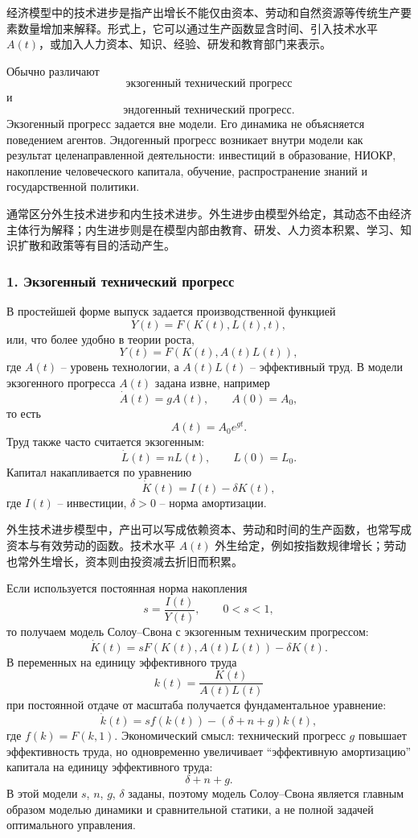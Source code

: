 \documentclass[12pt,a4paper]{article}
\newcommand{\zh}[1]{\par\noindent #1\par}
\begin{document}
\zh{经济模型中的技术进步是指产出增长不能仅由资本、劳动和自然资源等传统生产要素数量增加来解释。形式上，它可以通过生产函数显含时间、引入技术水平 $A(t)$，或加入人力资本、知识、经验、研发和教育部门来表示。}

Обычно различают
\[
\text{экзогенный технический прогресс}
\]
и
\[
\text{эндогенный технический прогресс}.
\]
Экзогенный прогресс задается вне модели. Его динамика не объясняется поведением агентов. Эндогенный прогресс возникает внутри модели как результат целенаправленной деятельности: инвестиций в образование, НИОКР, накопление человеческого капитала, обучение, распространение знаний и государственной политики.

\zh{通常区分外生技术进步和内生技术进步。外生进步由模型外给定，其动态不由经济主体行为解释；内生进步则是在模型内部由教育、研发、人力资本积累、学习、知识扩散和政策等有目的活动产生。}

\subsubsection*{1. Экзогенный технический прогресс}
В простейшей форме выпуск задается производственной функцией
\[
Y(t)=F(K(t),L(t),t),
\]
или, что более удобно в теории роста,
\[
Y(t)=F(K(t),A(t)L(t)),
\]
где $A(t)$ -- уровень технологии, а $A(t)L(t)$ -- эффективный труд. В модели экзогенного прогресса $A(t)$ задана извне, например
\[
\dot A(t)=gA(t), \qquad A(0)=A_0,
\]
то есть
\[
A(t)=A_0e^{gt}.
\]
Труд также часто считается экзогенным:
\[
\dot L(t)=nL(t), \qquad L(0)=L_0.
\]
Капитал накапливается по уравнению
\[
\dot K(t)=I(t)-\delta K(t),
\]
где $I(t)$ -- инвестиции, $\delta>0$ -- норма амортизации.

\zh{外生技术进步模型中，产出可以写成依赖资本、劳动和时间的生产函数，也常写成资本与有效劳动的函数。技术水平 $A(t)$ 外生给定，例如按指数规律增长；劳动也常外生增长，资本则由投资减去折旧而积累。}

Если используется постоянная норма накопления
\[
s=\frac{I(t)}{Y(t)}, \qquad 0<s<1,
\]
то получаем модель Солоу--Свона с экзогенным техническим прогрессом:
\[
\dot K(t)=sF(K(t),A(t)L(t))-\delta K(t).
\]
В переменных на единицу эффективного труда
\[
k(t)=\frac{K(t)}{A(t)L(t)}
\]
при постоянной отдаче от масштаба получается фундаментальное уравнение:
\[
\dot k(t)=sf(k(t))-(\delta+n+g)k(t),
\]
где $f(k)=F(k,1)$. Экономический смысл: технический прогресс $g$ повышает эффективность труда, но одновременно увеличивает ``эффективную амортизацию'' капитала на единицу эффективного труда:
\[
\delta+n+g.
\]
В этой модели $s$, $n$, $g$, $\delta$ заданы, поэтому модель Солоу--Свона является главным образом моделью динамики и сравнительной статики, а не полной задачей оптимального управления.
\end{document}
